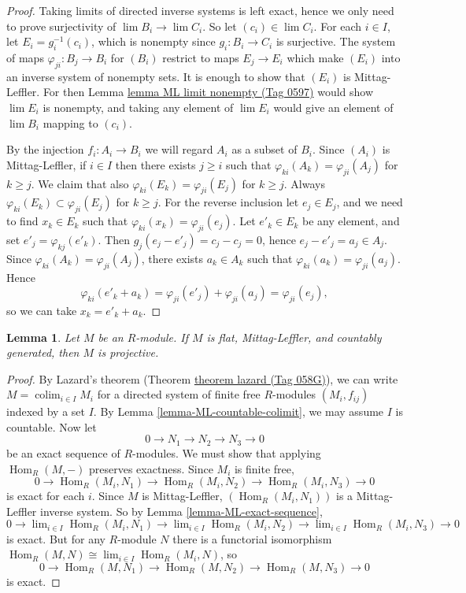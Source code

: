 \documentclass{amsart}
\theoremstyle{plain}
\newtheorem{lemma}[subsection]{Lemma}
\theoremstyle{definition}
\theoremstyle{remark}
\numberwithin{equation}{subsection}
\def\lim{\mathop{\mathrm{lim}}\nolimits}
\def\colim{\mathop{\mathrm{colim}}\nolimits}
\def\Hom{\mathop{\mathrm{Hom}}\nolimits}
\begin{document}
\begin{proof}
Taking limits of directed inverse systems is left exact, hence we only need to
prove surjectivity of $\lim B_i \to \lim C_i$.  So let $(c_i) \in \lim
C_i$.  For each $i \in I$, let $E_i = g_i^{-1}(c_i)$, which is nonempty since
$g_i: B_i \to C_i$ is surjective. The system of maps $\varphi_{ji}: B_j
\to B_i$ for $(B_i)$ restrict to maps $E_j \to E_i$ which
make $(E_i)$ into an inverse system of nonempty sets.  It is enough to show
that $(E_i)$ is Mittag-Leffler. For then Lemma \href{https://stacks.math.columbia.edu/tag/0597}{lemma ML limit nonempty (Tag 0597)}
would show $\lim E_i$ is nonempty, and taking any element of $\lim E_i$ would
give an element of $\lim B_i$ mapping to $(c_i)$.

\medskip\noindent
By the injection $f_i: A_i \to B_i$ we will regard $A_i$ as a subset of
$B_i$.  Since $(A_i)$ is Mittag-Leffler, if $i \in I$ then there exists $j \geq
i$ such that $\varphi_{ki}(A_k) = \varphi_{ji}(A_j)$ for $k \geq j$.  We claim
that also $\varphi_{ki}(E_k) = \varphi_{ji}(E_j)$ for $k \geq j$.  Always
$\varphi_{ki}(E_k) \subset \varphi_{ji}(E_j)$ for $k \geq j$.  For the reverse
inclusion let $e_j \in E_j$, and we need to find $x_k \in E_k$ such that
$\varphi_{ki}(x_k) = \varphi_{ji}(e_j)$.  Let $e'_k \in E_k$ be any element,
and set $e'_j = \varphi_{kj}(e'_k)$.  Then $g_j(e_j - e'_j) = c_j - c_j = 0$,
hence $e_j - e'_j = a_j \in A_j$.  Since $\varphi_{ki}(A_k) =
\varphi_{ji}(A_j)$, there exists $a_k \in A_k$ such that $\varphi_{ki}(a_k) =
\varphi_{ji}(a_j)$.  Hence
$$
\varphi_{ki}(e'_k + a_k) = \varphi_{ji}(e'_j) + \varphi_{ji}(a_j) =
\varphi_{ji}(e_j),
$$
so we can take $x_k = e'_k + a_k$.
\end{proof}


\begin{lemma}
\label{lemma-countgen-projective}
Let $M$ be an $R$-module.  If $M$ is flat, Mittag-Leffler, and countably
generated, then $M$ is projective.
\end{lemma}

\begin{proof}
By Lazard's theorem (Theorem \href{https://stacks.math.columbia.edu/tag/058G}{theorem lazard (Tag 058G)}), we can write $M =
\colim_{i
\in I} M_i$ for a directed system of finite free $R$-modules $(M_i, f_{ij})$
indexed by a set $I$.  By Lemma \ref{lemma-ML-countable-colimit}, we may assume
$I$ is countable.  Now let
$$
0 \to N_1 \to N_2 \to N_3 \to 0
$$
be an exact sequence of $R$-modules.  We must show that applying
$\Hom_R(M, -)$
preserves exactness.  Since $M_i$ is finite free,
$$
0 \to \Hom_R(M_i, N_1) \to \Hom_R(M_i, N_2) \to
\Hom_R(M_i, N_3) \to 0
$$
is exact for each $i$.  Since $M$ is Mittag-Leffler, $(\Hom_R(M_i,
N_{1}))$ is
a Mittag-Leffler inverse system.  So by Lemma \ref{lemma-ML-exact-sequence},
$$
0 \to \lim_{i \in I} \Hom_R(M_i, N_1) \to
\lim_{i \in I} \Hom_R(M_i, N_2) \to
\lim_{i \in I} \Hom_R(M_i, N_3) \to 0
$$
is exact.  But for any $R$-module $N$ there is a functorial isomorphism
$\Hom_R(M, N) \cong \lim_{i \in I} \Hom_R(M_i, N)$, so
$$
0 \to \Hom_R(M, N_1) \to \Hom_R(M, N_2) \to
\Hom_R(M, N_3) \to 0
$$
is exact.
\end{proof}
\end{document}

